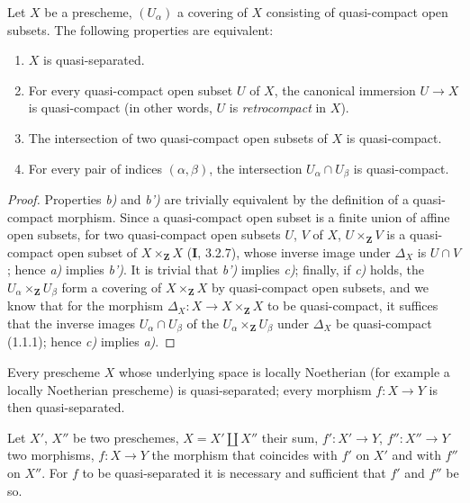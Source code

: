 \begin{proposition}[1.2.7]
\label{IV.1.2.7}
Let $X$ be a prescheme, $(U_\alpha)$ a covering of $X$ consisting of
quasi-compact open subsets. The following properties are equivalent:
\begin{enumerate}
  \item[\textup{a)}] $X$ is quasi-separated.
  \item[\textup{b)}] For every quasi-compact open subset $U$ of $X$, the canonical
  immersion $U\to X$ is quasi-compact \textup{(in other words, $U$ is \emph{retrocompact}
  in $X$)}.
  \item[\textup{b')}] The intersection of two quasi-compact open subsets of $X$ is
  quasi-compact.
  \item[\textup{c)}] For every pair of indices $(\alpha,\beta)$, the intersection
  $U_\alpha\cap U_\beta$ is quasi-compact.
\end{enumerate}
\end{proposition}

\begin{proof}
Properties \emph{b)} and \emph{b')} are trivially equivalent by the
definition of a quasi-compact morphism. Since a quasi-compact open subset is a
finite union of affine open subsets, for two quasi-compact open subsets $U$,
$V$ of $X$, $U\times_{\mathbf Z}V$ is a quasi-compact open subset of
$X\times_{\mathbf Z}X$ (\textbf{I}, 3.2.7), whose inverse image under $\Delta_X$ is
$U\cap V$; hence \emph{a)} implies \emph{b')}. It is trivial that \emph{b')}
implies \emph{c)}; finally, if \emph{c)} holds, the
$U_\alpha\times_{\mathbf Z}U_\beta$ form a covering of
$X\times_{\mathbf Z}X$ by quasi-compact open subsets, and we know that for
the morphism $\Delta_X:X\to X\times_{\mathbf Z}X$ to be quasi-compact, it
suffices that the inverse images $U_\alpha\cap U_\beta$ of the
$U_\alpha\times_{\mathbf Z}U_\beta$ under $\Delta_X$ be quasi-compact
(1.1.1); hence \emph{c)} implies \emph{a)}.
\end{proof}

\begin{corollary}[1.2.8]
\label{IV.1.2.8}
Every prescheme $X$ whose underlying space is locally Noetherian (for
example a locally Noetherian prescheme) is quasi-separated; every morphism
$f:X\to Y$ is then quasi-separated.
\end{corollary}

\begin{proposition}[1.2.9]
\label{IV.1.2.9}
Let $X'$, $X''$ be two preschemes, $X=X'\coprod X''$ their sum,
$f':X'\to Y$, $f'':X''\to Y$ two morphisms, $f:X\to Y$ the morphism that
coincides with $f'$ on $X'$ and with $f''$ on $X''$. For $f$ to be
quasi-separated it is necessary and sufficient that $f'$ and $f''$ be so.
\end{proposition}

